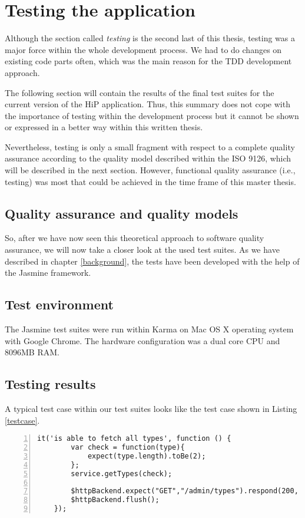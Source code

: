 \chapter[Testing the application]{Testing the application}
Although the section called \textit{testing} is the second last of this thesis, testing was a major force within the whole development process. We had to do changes on existing code parts often, which was the main reason for the \ac{TDD} development approach. 

The following section will contain the results of the final test suites for the current version of the HiP application. Thus, this summary does not cope with the importance of testing within the development process but it cannot be shown or expressed in a better way within this written thesis. 

Nevertheless, testing is only a small fragment with respect to a complete quality assurance according to the quality model described within the ISO 9126, which will be described in the next section. However, functional quality assurance (i.e., testing) was most that could be achieved in the time frame of this master thesis. 

\section{Quality assurance and quality models}

\cite{jung2004measuring}

So, after we have now seen this theoretical approach to software quality assurance, we will now take a closer look at the used test suites. As we have described in chapter \ref{background}, the tests have been developed with the help of the Jasmine framework.
  
\section{Test environment}
The Jasmine test suites were run within Karma on Mac OS X operating system with Google Chrome. The hardware configuration was a dual core \ac{CPU} and 8096MB \ac{RAM}.

\section{Testing results}
A typical test case within our test suites looks like the test case shown in Listing \ref{testcase}. 

\begin{lstlisting}[numbers=left,caption={Simple test case for the type service},label=testcase,frame=tlbr,breaklines]
    it('is able to fetch all types', function () {
        var check = function(type){
            expect(type.length).toBe(2);
        };
        service.getTypes(check);

        $httpBackend.expect("GET","/admin/types").respond(200, typeList);
        $httpBackend.flush();
    });
\end{lstlisting}

